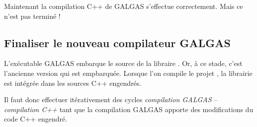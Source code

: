 Maintenant la compilation C++ de GALGAS s'effectue correctement. Mais ce n'est pas terminé !

\subsection{Finaliser le nouveau compilateur GALGAS}

L'exécutable GALGAS embarque le source de la libraire . Or, à ce stade, c'est l'ancienne version qui est empbarquée. Lorsque l'on compile le projet , la librairie  est intégrée dans les sources C++ engendrés.

Il faut donc effectuer itérativement des cycles \emph{compilation GALGAS} -- \emph{compilation C++} tant que la compilation GALGAS apporte des modifications du code C++ engendré.

